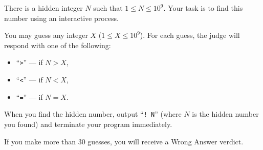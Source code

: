 There is a hidden integer $N$ such that $1 \leq N \leq 10^9$. Your task is to find this number using an interactive process.

You may guess any integer $X$ ($1 \leq X \leq 10^9$). For each guess, the judge will respond with one of the following:
\begin{itemize}
  \item ``\texttt{>}'' --- if $N > X$,
  \item ``\texttt{<}'' --- if $N < X$,
  \item ``\texttt{=}'' --- if $N = X$.
\end{itemize}

When you find the hidden number, output ``\texttt{! N}'' (where $N$ is the hidden number you found) and terminate your program immediately.

If you make more than 30 guesses, you will receive a Wrong Answer verdict.
